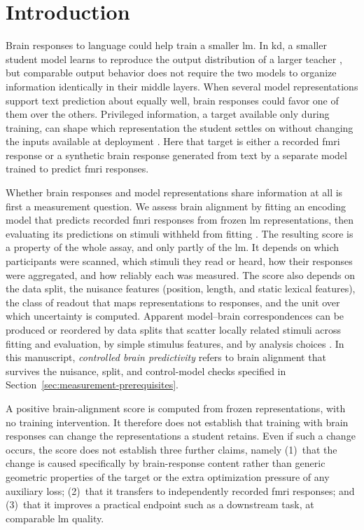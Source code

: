 \section{Introduction}
\label{sec:introduction}

Brain responses to language could help train a smaller \ac{lm}.
In \ac{kd}, a smaller student model learns to reproduce the output distribution of a larger teacher \autocite{hinton2015}, but comparable output behavior does not require the two models to organize information identically in their middle layers.
When several model representations support text prediction about equally well, brain responses could favor one of them over the others.
Privileged information, a target available only during training, can shape which representation the student settles on without changing the inputs available at deployment \autocite{lopezpaz2016,saadi2025}.
Here that target is either a recorded \ac{fmri} response or a synthetic brain response generated from text by a separate model trained to predict \ac{fmri} responses.

Whether brain responses and model representations share information at all is first a measurement question.
We assess brain alignment by fitting an encoding model that predicts recorded \ac{fmri} responses from frozen \ac{lm} representations, then evaluating its predictions on stimuli withheld from fitting \autocite{oota2023,merlin2024}.
The resulting score is a property of the whole assay, and only partly of the \ac{lm}.
It depends on which participants were scanned, which stimuli they read or heard, how their responses were aggregated, and how reliably each was measured.
The score also depends on the data split, the nuisance features (position, length, and static lexical features), the class of readout that maps representations to responses, and the unit over which uncertainty is computed.
Apparent model--brain correspondences can be produced or reordered by data splits that scatter locally related stimuli across fitting and evaluation, by simple stimulus features, and by analysis choices \autocite{hadidi2026,jia2026}.
In this manuscript, \emph{controlled brain predictivity} refers to brain alignment that survives the nuisance, split, and control-model checks specified in Section~\ref{sec:measurement-prerequisites}.

A positive brain-alignment score is computed from frozen representations, with no training intervention.
It therefore does not establish that training with brain responses can change the representations a student retains.
Even if such a change occurs, the score does not establish three further claims, namely (1)\ that the change is caused specifically by brain-response content rather than generic geometric properties of the target or the extra optimization pressure of any auxiliary loss; (2)\ that it transfers to independently recorded \ac{fmri} responses; and (3)\ that it improves a practical endpoint such as a downstream task, at comparable \ac{lm} quality.

